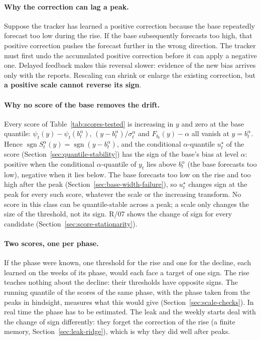 \documentclass[11pt,a4paper]{article}
\theoremstyle{definition}
\theoremstyle{remark}
\begin{document}
\paragraph{Why the correction can lag a peak.} Suppose the tracker has
learned a positive correction because the base repeatedly forecast too low
during the rise. If the base subsequently forecasts too high, that positive
correction pushes the forecast further in the wrong direction. The tracker
must first undo the accumulated positive correction before it can apply a
negative one. Delayed feedback makes this reversal slower: evidence of the
new bias arrives only with the reports. Rescaling can shrink or enlarge the
existing correction, but \textbf{a positive scale cannot reverse its sign}.

\paragraph{Why no score of the base removes the drift.} Every score of
Table~\ref{tab:scores-tested} is increasing in $y$ and zero at the base
quantile: $\psi_t(y)-\psi_t(b_t^\alpha)$, $(y-b_t^\alpha)/\sigma_t^\alpha$
and $F_{b_t}(y)-\alpha$ all vanish at $y=b_t^\alpha$. Hence
$\operatorname{sgn}S_t^\alpha(y)=\operatorname{sgn}(y-b_t^\alpha)$, and the
conditional $\alpha$-quantile $u_t^\star$ of the score
(Section~\ref{sec:quantile-stability}) has the sign of the base's bias at
level $\alpha$: positive when the conditional $\alpha$-quantile of $y_t$
lies above $b_t^\alpha$ (the base forecasts too low), negative when it lies
below. The base forecasts too low on the rise and too high after the peak
(Section~\ref{sec:base-width-failure}), so $u_t^\star$ changes sign at the
peak for every such score, whatever the scale or the increasing transform.
No score in this class can be quantile-stable across a peak; a scale only
changes the size of the threshold, not its sign. R/07 shows the change of
sign for every candidate (Section~\ref{sec:score-stationarity}).

\paragraph{Two scores, one per phase.} If the phase were known, one
threshold for the rise and one for the decline, each learned on the weeks
of its phase, would each face a target of one sign. The rise teaches
nothing about the decline: their thresholds have opposite signs. The
running quantile of the scores of the same phase, with the phase taken
from the peaks in hindsight, measures what this would give
(Section~\ref{sec:scale-checks}). In real time the phase has to be
estimated. The leak and the weekly starts deal with the change of sign
differently: they forget the correction of the rise (a finite memory,
Section~\ref{sec:leak-ridge}), which is why they did well after peaks.
\end{document}
